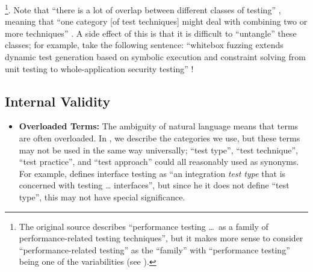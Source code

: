 \begin{itemize}
          \citep[p.~1187]{Moghadam2019}\footnote{The original source describes
              ``performance testing \dots\ as a family of performance-related
              testing techniques'', but it makes more sense to consider
              ``performance-related testing'' as the ``family'' with
              ``performance testing'' being one of the variabilities
              (see ).}. Note that ``there is a lot of
          overlap between different classes of testing'' \citep[p.~8]{Firesmith2015},
          meaning that ``one category [of test techniques] might deal with
          combining two or more techniques'' \citep[p.~5\=/10]{SWEBOK2024}.
          A side effect of this is that it is difficult to ``untangle'' these
          classes; for example, take the following sentence: ``whitebox fuzzing
          extends dynamic test generation based on symbolic execution and
          constraint solving from unit testing to whole-application security
          testing'' \citep[p.~23]{GodefroidAndLuchaup2011}!
\end{itemize}

\begin{landscape}%
    \otherCatsTable{}%
\end{landscape}

\subsection{Internal Validity}\label{inter-valid}

\begin{itemize}
    \item \textbf{Overloaded Terms:} The ambiguity of natural language means
          that terms are often overloaded. In , we describe
          the categories we use, but these terms may not be used in the same
          way universally; ``test type'', ``test technique'', ``test practice'',
          and ``test approach'' could all reasonably used as synonyms. For
          example, \citet[p.~45\ifnotpaper, emphasis added\fi]{Kam2008}
          defines interface testing as ``an integration \emph{test type} that
          is concerned with testing \dots{} interfaces'', but since \ifnotpaper
              he \else it \fi does not define ``test type'', this may not have
          special significance.
\end{itemize}

